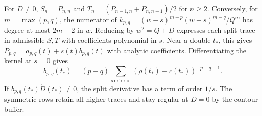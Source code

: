For \(D\ne0\), \(S_n=P_{n,n}\) and
\(T_n=(P_{n-1,n}+P_{n,n-1})/2\) for \(n\ge2\).
Conversely, for \(m=\max(p,q)\), the numerator of
\(k_{p,q}=(w-s)^{m-p}(w+s)^{m-q}/Q^m\) has degree at most
\(2m-2\) in \(w\). Reducing by \(w^2=Q+D\) expresses each split
trace in admissible \(S,T\) with coefficients polynomial in \(s\).
Near a double \(t_*\), this gives \(P_{p,q}=a_{p,q}(t)+s(t)b_{p,q}(t)\)
with analytic coefficients. Differentiating the kernel at \(s=0\)
gives
\[
 b_{p,q}(t_*)=(p-q)\sum_{\rho\ \mathrm{exterior}}
      (\rho(t_*)-c(t_*))^{-p-q-1}.
\]
If \(b_{p,q}(t_*)\dot D(t_*)\ne0\), the split derivative has a
term of order \(1/s\). The symmetric rows retain all higher
traces and stay regular at \(D=0\) by the contour buffer.
